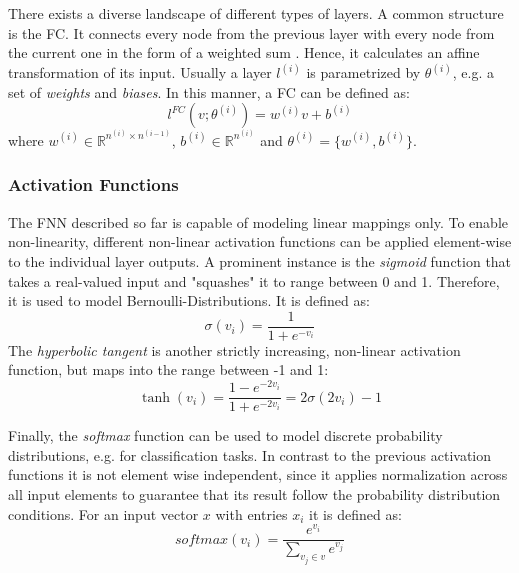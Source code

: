 There exists a diverse landscape of different types of layers. A common structure is the \ac{FC}. It connects every node from the previous layer with every node from the current one in the form of a weighted sum . Hence, it calculates an affine transformation of its input. Usually a layer $l^{(i)}$ is parametrized by $\theta^{(i)}$, e.g. a set of \textit{weights} and \textit{biases}. In this manner, a \ac{FC} can be defined as:
\begin{equation}
l^{FC}(v;\theta^{(i)}) = w^{(i)}v+b^{(i)} 
\end{equation}
where $w^{(i)} \in \mathbb{R}^{n^{(i)} \times n^{(i-1)}}$, $b^{(i)} \in \mathbb{R}^{n^{(i)}}$ and $\theta^{(i)}=\{w^{(i)}, b^{(i)}\}$. 

\subsubsection{Activation Functions}
The \ac{FNN} described so far is capable of modeling linear mappings only. To enable non-linearity, different non-linear activation functions can be applied element-wise to the individual layer outputs. A prominent instance is the \textit{sigmoid} function that takes a real-valued input and "squashes" it to range between 0 and 1. Therefore, it is used to model Bernoulli-Distributions. It is defined as:
\begin{equation}
\sigma(v_i)=\frac{1}{1+e^{-v_i}}
\end{equation}
The \textit{hyperbolic tangent} is another strictly increasing, non-linear activation function, but maps into the range between -1 and 1:
\begin{equation}
\tanh(v_i)=\frac{1-e^{-2v_i}}{1+e^{-2v_i}}=2\sigma(2v_i)-1
\end{equation}

Finally, the \textit{softmax} function can be used to model discrete probability distributions, e.g. for classification tasks. In contrast to the previous activation functions it is not element wise independent, since it applies normalization across all input elements to guarantee that its result follow the probability distribution conditions. For an input vector $x$ with entries $x_i$ it is defined as:
\begin{equation}
softmax(v_i) = \frac{e^{v_i}}{\sum\limits_{v_j \in v}e^{v_j}} 
\end{equation}

